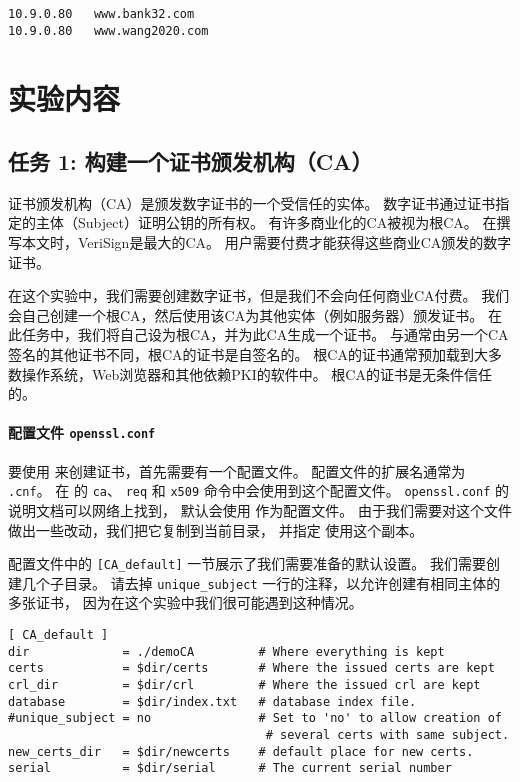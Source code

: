 \begin{lstlisting}
10.9.0.80   www.bank32.com
10.9.0.80   www.wang2020.com
\end{lstlisting}


\section{实验内容}


\subsection{任务 1: 构建一个证书颁发机构（CA）}

证书颁发机构（CA）是颁发数字证书的一个受信任的实体。
数字证书通过证书指定的主体（Subject）证明公钥的所有权。
有许多商业化的CA被视为根CA。
在撰写本文时，VeriSign是最大的CA。
用户需要付费才能获得这些商业CA颁发的数字证书。


在这个实验中，我们需要创建数字证书，但是我们不会向任何商业CA付费。
我们会自己创建一个根CA，然后使用该CA为其他实体（例如服务器）颁发证书。
在此任务中，我们将自己设为根CA，并为此CA生成一个证书。
与通常由另一个CA签名的其他证书不同，根CA的证书是自签名的。
根CA的证书通常预加载到大多数操作系统，Web浏览器和其他依赖PKI的软件中。
根CA的证书是无条件信任的。


\paragraph{配置文件 {\tt openssl.conf}}
要使用 \OpenSSL 来创建证书，首先需要有一个配置文件。
配置文件的扩展名通常为 {\tt .cnf}。
在 \OpenSSL 的 {\tt ca}、 {\tt req} 和 {\tt x509} 命令中会使用到这个配置文件。
\texttt{openssl.conf} 的说明文档可以网络上找到，
\OpenSSL 默认会使用  作为配置文件。
由于我们需要对这个文件做出一些改动，我们把它复制到当前目录，
并指定 \OpenSSL 使用这个副本。

配置文件中的 \texttt{[CA\_default]} 一节展示了我们需要准备的默认设置。
我们需要创建几个子目录。
请去掉 \texttt{unique\_subject} 一行的注释，以允许创建有相同主体的多张证书，
因为在这个实验中我们很可能遇到这种情况。

\begin{lstlisting}[caption={Default CA setting}]
[ CA_default ]
dir             = ./demoCA         # Where everything is kept
certs           = $dir/certs       # Where the issued certs are kept
crl_dir         = $dir/crl         # Where the issued crl are kept
database        = $dir/index.txt   # database index file.
#unique_subject = no               # Set to 'no' to allow creation of
                                    # several certs with same subject.
new_certs_dir   = $dir/newcerts    # default place for new certs.
serial          = $dir/serial      # The current serial number
\end{lstlisting}


